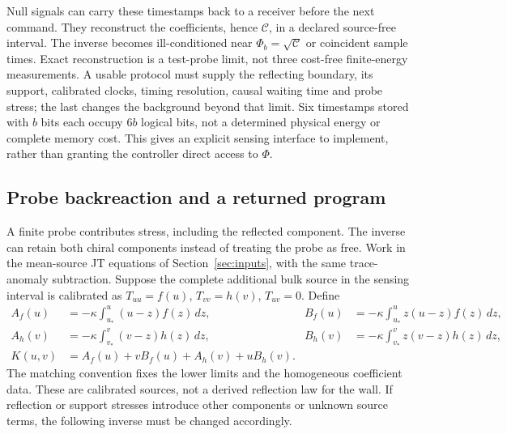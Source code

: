\documentclass[12pt,a4paper]{article}
\begin{document}
Null signals can carry these timestamps back to a receiver before the next
command. They reconstruct the coefficients, hence $\mathcal C$, in a declared
source-free interval. The inverse becomes ill-conditioned near
$\Phi_b=\sqrt{\mathcal C}$ or coincident sample times. Exact reconstruction is
a test-probe limit, not three cost-free finite-energy measurements. A usable
protocol must supply the reflecting boundary, its support, calibrated clocks,
timing resolution, causal waiting time and probe stress; the last changes the
background beyond that limit. Six timestamps stored with $b$ bits each occupy
$6b$ logical bits, not a determined physical energy or complete memory cost.
This gives an explicit sensing interface to implement, rather than granting the
controller direct access to $\Phi$.

\subsection{Probe backreaction and a returned program}
\label{sec:returned-program}

A finite probe contributes stress, including the reflected component. The inverse
can retain both chiral components instead of treating the probe as free. Work in
the mean-source JT equations of Section~\ref{sec:inputs}, with the same trace-anomaly
subtraction. Suppose the complete additional bulk source in the sensing interval
is calibrated as $T_{uu}=f(u)$, $T_{vv}=h(v)$, $T_{uv}=0$. Define
\begin{align}
 A_f(u)&=-\kappa\int_{u_*}^{u}(u-z)f(z)\,dz,&
 B_f(u)&=-\kappa\int_{u_*}^{u}z(u-z)f(z)\,dz,\nonumber\\
 A_h(v)&=-\kappa\int_{v_*}^{v}(v-z)h(z)\,dz,&
 B_h(v)&=-\kappa\int_{v_*}^{v}z(v-z)h(z)\,dz,\nonumber\\
 K(u,v)&=A_f(u)+vB_f(u)+A_h(v)+uB_h(v).
 \label{eq:two-chiral-K}
\end{align}
The matching convention fixes the lower limits and the homogeneous coefficient
data. These are calibrated sources, not a derived reflection law for the wall.
If reflection or support stresses introduce other components or unknown source
terms, the following inverse must be changed accordingly.
\end{document}
